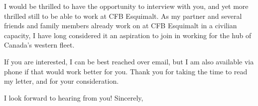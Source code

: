 \documentclass{letter}
\begin{document}
\begin{letter}{}

I would be thrilled to have the opportunity to interview with you, and yet more thrilled still to be able to work at CFB Esquimalt. As my partner and several friends and family members already work on at CFB Esquimalt in a civilian capacity, I have long considered it an aspiration to join in working for the hub of Canada’s western fleet.


If you are interested, I can be best reached over email, but I am also available via phone if that would work better for you. Thank you for taking the time to read my letter, and for your consideration.

\closing{I look forward to hearing from you! Sincerely,}
\end{letter}
\end{document}
